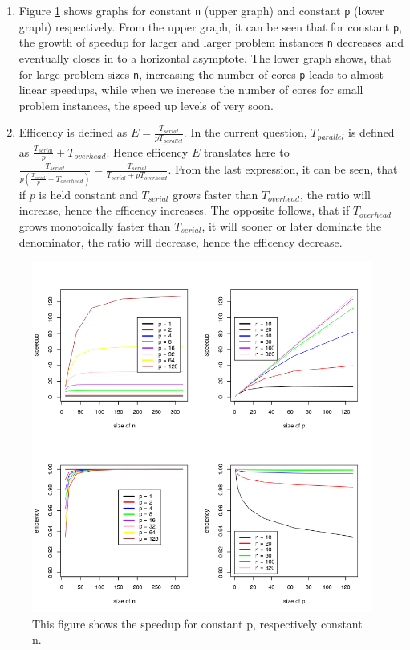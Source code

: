 \documentclass[a4paper,11pt,twoside]{article}
\begin{document}
\begin{enumerate}[label={\alph*)}]
\item Figure \ref{fig:speedup} shows graphs for constant \verb+n+ (upper graph) and constant \verb+p+ (lower graph) respectively. From the upper graph, it can be seen that for constant \verb+p+, the growth of speedup for larger and larger problem instances \verb+n+ decreases and eventually closes in to a horizontal asymptote. The lower graph shows, that for large problem sizes \verb+n+, increasing the number of cores \verb+p+ leads to almost linear speedups, while when we increase the number of cores for small problem instances, the speed up levels of very soon.    

\item Efficency is defined as $E = \frac{T_{serial}}{pT_{parallel}}$. In the current question, $T_{parallel}$ is defined as $\frac{T_{serial}}{p}+T_{overhead}$. Hence efficency $E$ translates here to $\frac{T_{serial}}{p(\frac{T_{serial}}{p}+T_{overhead})} = \frac{T_{serial}}{T_{serial}+pT_{overhead}}$. From the last expression, it can be seen, that if $p$ is held constant and $T_{serial}$ grows faster than $T_{overhead}$, the ratio will increase, hence the efficency increases.
The opposite follows, that if $T_{overhead}$ grows monotoically faster than $T_{serial}$, it will sooner or later dominate the denominator, the ratio will decrease, hence the efficency decrease.
  
\end{enumerate}


\begin{figure}
  
  \centering
    \includegraphics[width=1\textwidth]{speedup.png}
    \caption{This figure shows the speedup for constant p, respectively constant n.}
    \label{fig:speedup}
\end{figure}
\end{document}
